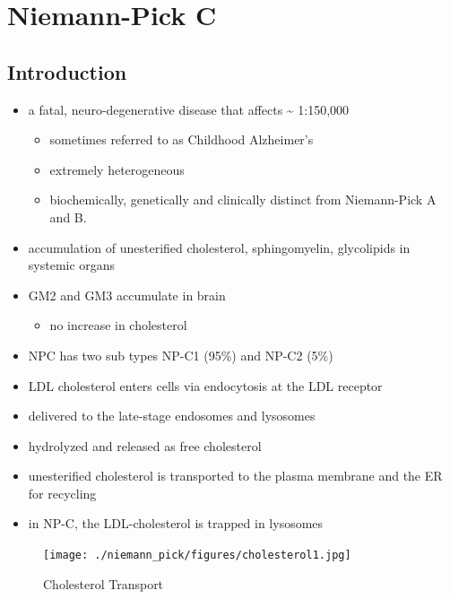 \documentclass{scrartcl}
\begin{document}
\section{Niemann-Pick C}
\label{sec:org3349188}
\subsection{Introduction}
\label{sec:org38517ce}
\begin{itemize}
\item a fatal, neuro-degenerative disease that affects \textasciitilde{} 1:150,000
\begin{itemize}
\item sometimes referred to as Childhood Alzheimer’s
\item extremely heterogeneous
\item biochemically, genetically and clinically distinct from Niemann-Pick A and B.
\end{itemize}
\item accumulation of unesterified cholesterol, sphingomyelin, glycolipids in systemic organs
\item GM2 and GM3 accumulate in brain
\begin{itemize}
\item no increase in cholesterol
\end{itemize}
\item NPC has two sub types NP-C1 (95\%) and NP-C2 (5\%)

\item LDL cholesterol enters cells via endocytosis at the LDL receptor
\item delivered to the late-stage endosomes and lysosomes
\item hydrolyzed and released as free cholesterol
\item unesterified cholesterol is transported to the plasma membrane and the ER for recycling

\item in NP-C, the LDL-cholesterol is trapped in lysosomes
\end{itemize}

\begin{figure}[htbp]
\centering
\texttt{[image: ./niemann\_pick/figures/cholesterol1.jpg]}
\caption{\label{fig:orgc8f98ff}
Cholesterol Transport}
\end{figure}
\end{document}
